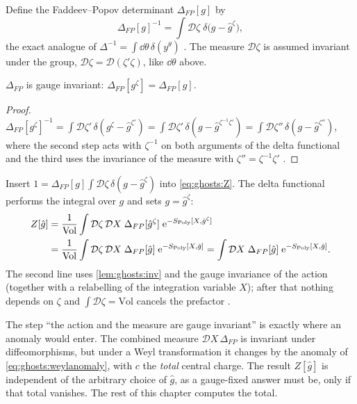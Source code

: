 Define the Faddeev--Popov determinant $\Delta_{FP}[g]$ by
\begin{equation}\label{eq:ghosts:fpdef}
  \Delta_{FP}[g]^{-1}=\int\mathcal{D}\zeta\;\delta\bigl(g-\hat g^{\zeta}\bigr),
\end{equation}
the exact analogue of $\Delta^{-1}=\int\dd\theta\,\delta(y^\theta)$
. The measure $\mathcal D\zeta$ is assumed invariant
under the group, $\mathcal D\zeta=\mathcal D(\zeta'\zeta)$, like $\dd\theta$ above.

\begin{lemma}\label{lem:ghosts:inv}
$\Delta_{FP}$ is gauge invariant: $\Delta_{FP}[g^\zeta]=\Delta_{FP}[g]$.
\end{lemma}
\begin{proof}
$\Delta_{FP}[g^\zeta]^{-1}=\int\mathcal D\zeta'\,\delta(g^\zeta-\hat g^{\zeta'})
=\int\mathcal D\zeta'\,\delta(g-\hat g^{\zeta^{-1}\zeta'})
=\int\mathcal D\zeta''\,\delta(g-\hat g^{\zeta''})$, where the second step acts with
$\zeta^{-1}$ on both arguments of the delta functional and the third uses the invariance of
the measure with $\zeta''=\zeta^{-1}\zeta'$ .
\end{proof}

Insert $1=\Delta_{FP}[g]\int\mathcal D\zeta\,\delta(g-\hat g^\zeta)$ into
\cref{eq:ghosts:Z}. The delta functional performs the integral over $g$ and sets
$g=\hat g^\zeta$:
\begin{align}
  Z[\hat g]&=\frac{1}{\mathrm{Vol}}\int\mathcal D\zeta\,\mathcal DX\;
     \Delta_{FP}[\hat g^\zeta]\;\mathrm{e}^{-S_{\mathrm{Poly}}[X,\hat g^\zeta]}\notag\\
  &=\frac{1}{\mathrm{Vol}}\int\mathcal D\zeta\,\mathcal DX\;
     \Delta_{FP}[\hat g]\;\mathrm{e}^{-S_{\mathrm{Poly}}[X,\hat g]}
  =\int\mathcal DX\;\Delta_{FP}[\hat g]\;\mathrm{e}^{-S_{\mathrm{Poly}}[X,\hat g]} .
  \label{eq:ghosts:Zfixed}
\end{align}
The second line uses \cref{lem:ghosts:inv} and the gauge invariance of the action (together
with a relabelling of the integration variable $X$); after that nothing depends on $\zeta$
and $\int\mathcal D\zeta=\mathrm{Vol}$ cancels the prefactor
.

\begin{pitfallbox}
The step ``the action and the measure are gauge invariant'' is exactly where an anomaly would
enter. The combined measure $\mathcal DX\,\Delta_{FP}$ is invariant under diffeomorphisms, but
under a Weyl transformation it changes by the anomaly of \cref{eq:ghosts:weylanomaly}, with $c$
the \emph{total} central charge. The result $Z[\hat g]$ is independent of the arbitrary choice
of $\hat g$, as a gauge-fixed answer must be, only if that total vanishes. The rest of this
chapter computes the total.
\end{pitfallbox}

